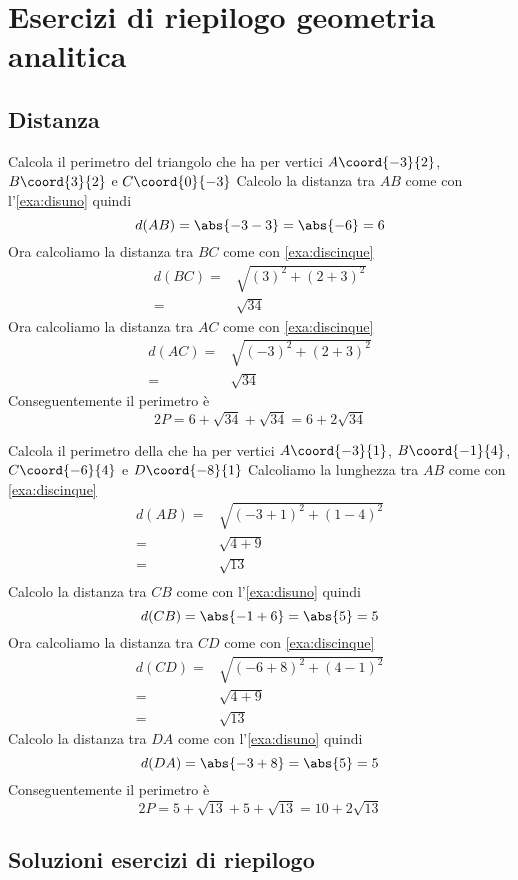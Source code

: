 \chapter{Esercizi di riepilogo geometria analitica}
\section{Distanza}
\tcbstartrecording
\begin{exercise}
Calcola il perimetro del triangolo che ha per vertici $A\coord{-3}{2}$, $B\coord{3}{2}$ e $C\coord{0}{-3}$
\tcblower
Calcolo la distanza tra $AB$ come con l'\cref{exa:disuno} 
quindi \[d(AB)=\abs{-3-3}=\abs{-6}=6\] Ora calcoliamo la distanza tra $BC$ come con \cref{exa:discinque} 
\begin{align*}
d(BC)=&\sqrt{(3)^2+(2+3)^2}\\
=&\sqrt{34}
\end{align*}
Ora calcoliamo la distanza tra $AC$ come con \cref{exa:discinque} 
\begin{align*}
d(AC)=&\sqrt{(-3)^2+(2+3)^2}\\
=&\sqrt{34}
\end{align*}
Conseguentemente il perimetro è
\[2P=6+\sqrt{34}+\sqrt{34}=6+2\sqrt{34}\]
\begin{center}
	
	\label{fig:EsRieDistanza11}
\end{center}
\end{exercise}
\begin{exercise}
	Calcola il perimetro della che ha per vertici $A\coord{-3}{1}$, $B\coord{-1}{4}$, $C\coord{-6}{4}$ e  $D\coord{-8}{1}$
	\tcblower
	Calcoliamo la lunghezza tra $AB$ come con \cref{exa:discinque} 
	\begin{align*}
		d(AB)=&\sqrt{(-3+1)^2+(1-4)^2}\\
		=&\sqrt{4+9}\\
		=&\sqrt{13}\\
	\end{align*}
	Calcolo la distanza tra $CB$ come con l'\cref{exa:disuno} 
	quindi \[d(CB)=\abs{-1+6}=\abs{5}=5\]
	Ora calcoliamo la distanza tra $CD$ come con \cref{exa:discinque} 
	\begin{align*}
		d(CD)=&\sqrt{(-6+8)^2+(4-1)^2}\\
			=&\sqrt{4+9}\\
		=&\sqrt{13}
	\end{align*}
	Calcolo la distanza tra $DA$ come con l'\cref{exa:disuno} 
	quindi \[d(DA)=\abs{-3+8}=\abs{5}=5\]
	Conseguentemente il perimetro è
	\[2P=5+\sqrt{13}+5+\sqrt{13}=10+2\sqrt{13}\]
	\begin{center}
		
		\label{fig:EsRieDistanza12}
	\end{center}
\end{exercise}
\tcbstoprecording
\newpage
\section{Soluzioni esercizi di riepilogo}
\tcbinputrecords							